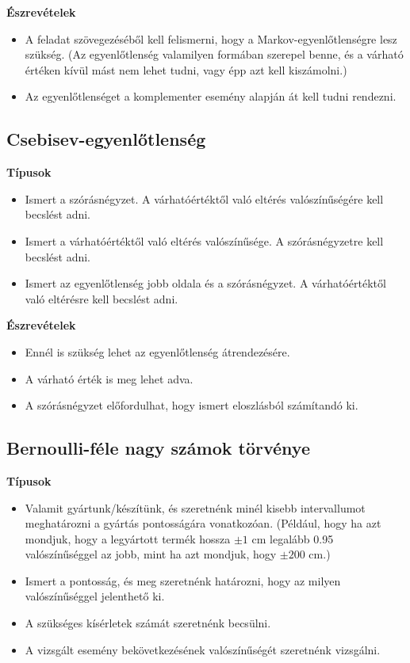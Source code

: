 \documentclass[a4paper]{article}
\begin{document}
\noindent \textbf{Észrevételek}

\begin{itemize}
\item A feladat szövegezéséből kell felismerni, hogy a Markov-egyenlőtlenségre lesz szükség. (Az egyenlőtlenség valamilyen formában szerepel benne, és a várható értéken kívül mást nem lehet tudni, vagy épp azt kell kiszámolni.)
\item Az egyenlőtlenséget a komplementer esemény alapján át kell tudni rendezni.
\end{itemize}

\subsection{Csebisev-egyenlőtlenség}

\noindent \textbf{Típusok}

\begin{itemize}
\item Ismert a szórásnégyzet. A várhatóértéktől való eltérés valószínűségére kell becslést adni.
\item Ismert a várhatóértéktől való eltérés valószínűsége. A szórásnégyzetre kell becslést adni.
\item Ismert az egyenlőtlenség jobb oldala és a szórásnégyzet. A várhatóértéktől való eltérésre kell becslést adni.
\end{itemize}

\noindent \textbf{Észrevételek}

\begin{itemize}
\item Ennél is szükség lehet az egyenlőtlenség átrendezésére.
\item A várható érték is meg lehet adva.
\item A szórásnégyzet előfordulhat, hogy ismert eloszlásból számítandó ki.
\end{itemize}

\subsection{Bernoulli-féle nagy számok törvénye}

\noindent \textbf{Típusok}

\begin{itemize}
\item Valamit gyártunk/készítünk, és szeretnénk minél kisebb intervallumot meghatározni a gyártás pontosságára vonatkozóan. (Például, hogy ha azt mondjuk, hogy a legyártott termék hossza $\pm 1$ cm legalább 0.95 valószínűséggel az jobb, mint ha azt mondjuk, hogy $\pm 200$ cm.)
\item Ismert a pontosság, és meg szeretnénk határozni, hogy az milyen valószínűséggel jelenthető ki.
\item A szükséges kísérletek számát szeretnénk becsülni.
\item A vizsgált esemény bekövetkezésének valószínűségét szeretnénk vizsgálni.
\end{itemize}
\end{document}

